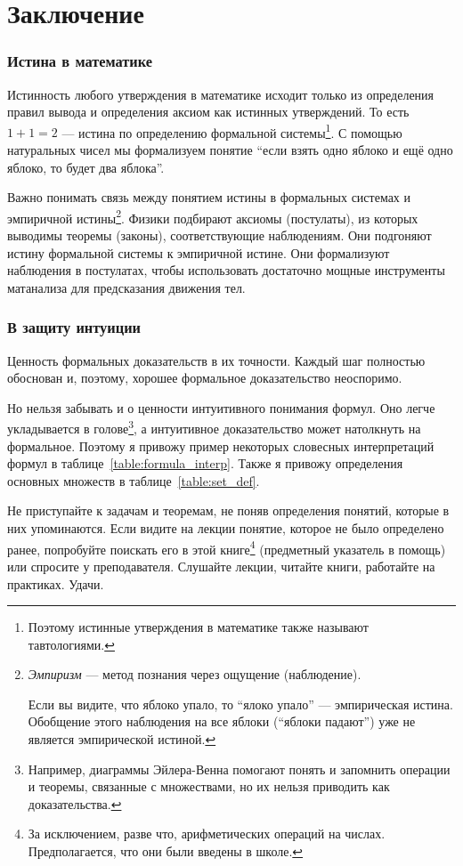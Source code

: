 \part{Заключение}

\section{Истина в математике}

Истинность любого утверждения в математике исходит только из определения правил
вывода и определения аксиом как истинных утверждений.
То есть $1+1=2$ --- истина по определению формальной системы\footnote{
  Поэтому истинные утверждения в математике также называют тавтологиями.}.
С помощью натуральных чисел мы формализуем понятие ``если взять одно яблоко
и ещё одно яблоко, то будет два яблока''.

Важно понимать связь между понятием истины в формальных системах
и эмпиричной истины\footnote{{\it Эмпиризм}
  --- метод познания через ощущение (наблюдение).

  Если вы видите, что яблоко упало, то ``ялоко упало'' --- эмпирическая истина.
  Обобщение этого наблюдения на все яблоки (``яблоки падают'') уже не является
  эмпирической истиной.}.
Физики подбирают аксиомы (постулаты),
из которых выводимы теоремы (законы), соответствующие наблюдениям.
Они подгоняют истину формальной системы к эмпиричной истине.
Они формализуют наблюдения в постулатах, чтобы использовать достаточно мощные
инструменты матанализа для предсказания движения тел.

\section{В защиту интуиции}

Ценность формальных доказательств в их точности.
Каждый шаг полностью обоснован и,
поэтому, хорошее формальное доказательство неоспоримо.

Но нельзя забывать и о ценности интуитивного понимания формул.
Оно легче укладывается в голове\footnote{Например, диаграммы
  Эйлера-Венна помогают понять и запомнить операции и теоремы, связанные с
  множествами, но их нельзя приводить как доказательства.},
а интуитивное доказательство может натолкнуть на формальное.
Поэтому я привожу пример некоторых словесных интерпретаций
формул в таблице~\ref{table:formula_interp}.
Также я привожу определения основных множеств в таблице~\ref{table:set_def}.

Не приступайте к задачам и теоремам, не поняв определения понятий,
которые в них упоминаются. Если видите на лекции понятие,
которое не было определено ранее,
попробуйте поискать его в этой книге\footnote{
  За исключением, разве что, арифметических операций на числах.
  Предполагается, что они были введены в школе.
} (предметный указатель в помощь) или спросите у преподавателя.
Слушайте лекции, читайте книги, работайте
на практиках. Удачи.

